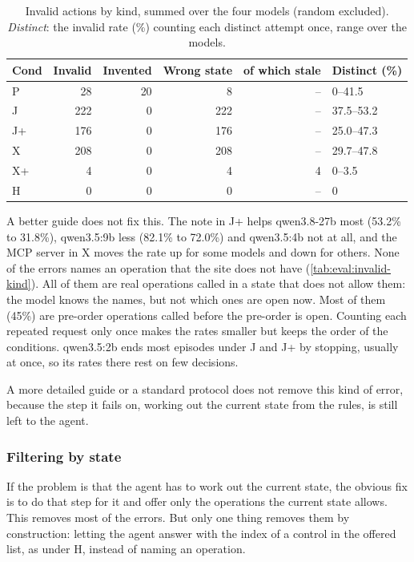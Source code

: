 \begin{table}[htbp]
\centering
\small
\caption{Invalid actions by kind, summed over the four models (random excluded). \emph{Distinct}: the invalid rate (\%) counting each distinct attempt once, range over the models.}
\label{tab:eval:invalid-kind}
\begin{tabular}{lrrrrl}
\hline
Cond & Invalid & Invented & Wrong state & of which stale & Distinct (\%) \\
\hline
P & 28 & 20 & 8 & -- & 0--41.5 \\
J & 222 & 0 & 222 & -- & 37.5--53.2 \\
J+ & 176 & 0 & 176 & -- & 25.0--47.3 \\
X & 208 & 0 & 208 & -- & 29.7--47.8 \\
X+ & 4 & 0 & 4 & 4 & 0--3.5 \\
H & 0 & 0 & 0 & -- & 0 \\
\hline
\end{tabular}
\end{table}

A better guide does not fix this.
The note in J+ helps qwen3.8-27b most (53.2\% to 31.8\%), qwen3.5:9b less (82.1\% to 72.0\%) and qwen3.5:4b not at all, and the MCP server in X moves the rate up for some models and down for others.
None of the errors names an operation that the site does not have (\autoref{tab:eval:invalid-kind}).
All of them are real operations called in a state that does not allow them: the model knows the names, but not which ones are open now.
Most of them (45\%) are pre-order operations called before the pre-order is open.
Counting each repeated request only once makes the rates smaller but keeps the order of the conditions. qwen3.5:2b ends most episodes under J and J+ by stopping, usually at once, so its rates there rest on few decisions.

A more detailed guide or a standard protocol does not remove this kind of error, because the step it fails on, working out the current state from the rules, is still left to the agent.

\FloatBarrier

\subsubsection{Filtering by state}\label{sec:eval:results:c2}

If the problem is that the agent has to work out the current state, the obvious fix is to do that step for it and offer only the operations the current state allows.
This removes most of the errors.
But only one thing removes them by construction: letting the agent answer with the index of a control in the offered list, as under H, instead of naming an operation.


